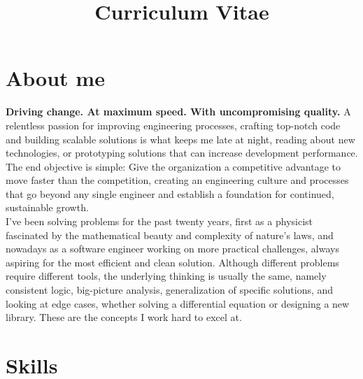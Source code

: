 \documentclass[11pt,a4paper,sans]{moderncv}        %
\title{Curriculum Vitae}                               %
\begin{document}
\makecvtitle

\section{About me}

  \textbf{Driving change. At maximum speed. With uncompromising quality.} A relentless passion for improving engineering processes, crafting top-notch code and building scalable solutions is
  what keeps me late at night, reading about new technologies, or prototyping solutions that can increase development performance. The end objective is simple: Give the organization a competitive advantage to move
  faster than the competition, creating an engineering culture and processes that go beyond any single engineer and establish a foundation for continued, sustainable growth. \\

  I've been solving problems for the past twenty years, first as a physicist fascinated by the mathematical beauty and complexity of nature's laws, and nowadays as a software
  engineer working on more practical challenges, always aspiring for the most efficient and clean solution. Although different problems require different tools, the underlying thinking
  is usually the same, namely consistent logic, big-picture analysis, generalization of specific solutions, and looking at edge cases, whether solving a
  differential equation or designing a new library. These are the concepts I work hard to excel at.

\nopagebreak[4]

\section{Skills}




\end{document}
